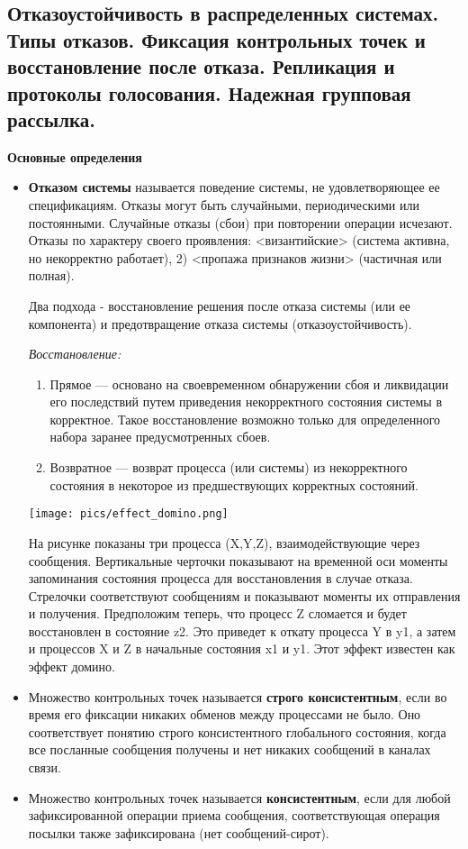 \subsection{Отказоустойчивость  в  распределенных  системах.  Типы  отказов.  Фиксация  контрольных  точек  и восстановление после отказа. Репликация и протоколы голосования. Надежная групповая рассылка.}

\textbf{Основные определения}

\begin{itemize}
    \item \textbf{Отказом системы} называется поведение системы, не удовлетворяющее ее спецификациям.
    Отказы могут быть случайными, периодическими или постоянными. 
    Случайные отказы (сбои) при повторении операции исчезают. 
    Отказы по характеру своего проявления: <византийские> (система активна, но некорректно работает), 2) <пропажа признаков жизни> (частичная или полная). 
    
    Два подхода - восстановление решения после отказа системы (или ее компонента) и предотвращение отказа системы (отказоустойчивость).
    
    \textit{Восстановление:}
    \begin{enumerate}
        \item Прямое --- основано на своевременном обнаружении сбоя и ликвидации его последствий путем приведения некорректного состояния системы в корректное. 
        Такое восстановление возможно только для определенного набора заранее предусмотренных сбоев.
        \item Возвратное --- возврат процесса (или системы) из некорректного состояния в некоторое из предшествующих корректных состояний.
    \end{enumerate}
    
    \texttt{[image: pics/effect\_domino.png]}
    
    На рисунке показаны три процесса (X,Y,Z), взаимодействующие через сообщения. Вертикальные черточки показывают на временной оси моменты запоминания состояния процесса для восстановления в случае отказа. Стрелочки соответствуют сообщениям и показывают моменты их отправления и получения. Предположим теперь, что процесс Z сломается и будет восстановлен в состояние z2. Это приведет к откату процесса Y в y1, а затем и процессов X и Z в начальные состояния x1 и y1. Этот эффект известен как эффект домино.
    
    \item Множество контрольных точек называется \textbf{строго консистентным}, если во время его фиксации никаких обменов между процессами не было. 
    Оно соответствует понятию строго консистентного глобального состояния, когда все посланные сообщения получены и нет никаких сообщений в каналах связи.
    \item Множество контрольных точек называется \textbf{консистентным}, если для любой зафиксированной операции приема сообщения, соответствующая операция посылки также зафиксирована (нет сообщений-сирот).
\end{itemize}

